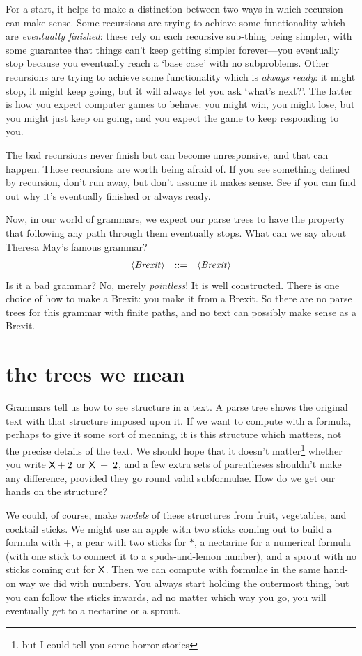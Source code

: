 \documentclass{book}
\begin{document}
For a start, it helps to make a distinction between two ways in which recursion can make sense. Some recursions are trying to achieve some functionality which are \emph{eventually finished}: these rely on each recursive sub-thing being simpler, with some guarantee that things can't keep getting simpler forever---you eventually stop because you eventually reach a `base case' with no subproblems. Other recursions are trying to achieve some functionality which is \emph{always ready}: it might stop, it might keep going, but it will always let you ask `what's next?'. The latter is how you expect computer games to behave: you might win, you might lose, but you might just keep on going, and you expect the game to keep responding to you.

The bad recursions never finish but can become unresponsive, and that can happen. Those recursions are worth being afraid of. If you see something defined by recursion, don't run away, but don't assume it makes sense. See if you can find out why it's eventually finished or always ready.

Now, in our world of grammars, we expect our parse trees to have the property that following any path through them eventually stops. What can we say about Theresa May's famous grammar?
\[\begin{array}{rrl}
\langle\mathit{Brexit}\rangle & ::= & \langle\mathit{Brexit}\rangle
\end{array}\]
Is it a bad grammar? No, merely \emph{pointless}! It is well constructed. There is one choice of how to make a Brexit: you make it from a Brexit. So there are no parse trees for this grammar with finite paths, and no text can possibly make sense as a Brexit.


\section{the trees we mean}

Grammars tell us how to see structure in a text. A parse tree shows the original text with that structure imposed upon it. If we want to compute with a formula, perhaps to give it some sort of meaning, it is this structure which matters, not the precise details of the text. We should hope that it doesn't matter\footnote{but I could tell you some horror stories} whether you write $\mathsf{X}+2$ or $\mathsf{X}\;+\;2$, and a few extra sets of parentheses shouldn't make any difference, provided they go round valid subformulae. How do we get our hands on the structure?

We could, of course, make \emph{models} of these structures from fruit, vegetables, and cocktail sticks. We might use an apple with two sticks coming out to build a formula with $+$, a pear with two sticks for $*$, a nectarine for a numerical formula (with one stick to connect it to a spuds-and-lemon number), and a sprout with no sticks coming out for $\mathsf{X}$. Then we can compute with formulae in the same hand-on way we did with numbers. You always start holding the outermost thing, but you can follow the sticks inwards, ad no matter which way you go, you will eventually get to a nectarine or a sprout.
\end{document}

